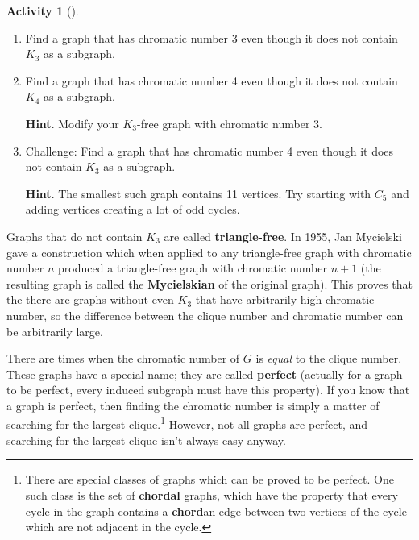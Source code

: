 \documentclass[10pt,]{book}
\newcommand{\terminology}[1]{\textbf{#1}}
\theoremstyle{plain}
\theoremstyle{definition}
\theoremstyle{definition}
\theoremstyle{definition}
\newtheorem{activity}[project]{Activity}
\numberwithin{equation}{chapter}
\begin{document}
\begin{activity}[]\label{activity-36}
\leavevmode%
\begin{enumerate}[font=\bfseries,label=(\alph*),ref=\alph*]
\item\label{task-55} \hypertarget{p-378}{}%
Find a graph that has chromatic number 3 even though it does not contain \(K_3\) as a subgraph.%
\item\label{task-56} \hypertarget{p-379}{}%
Find a graph that has chromatic number 4 even though it does not contain \(K_4\) as a subgraph.%
\par\smallskip%
\noindent\textbf{Hint}.\hypertarget{hint-16}{}\quad%
\hypertarget{p-380}{}%
Modify your \(K_3\)-free graph with chromatic number 3.%
\item\label{task-57} \hypertarget{p-381}{}%
Challenge: Find a graph that has chromatic number 4 even though it does not contain \(K_3\) as a subgraph.%
\par\smallskip%
\noindent\textbf{Hint}.\hypertarget{hint-17}{}\quad%
\hypertarget{p-382}{}%
The smallest such graph contains 11 vertices.  Try starting with \(C_5\) and adding vertices creating a lot of odd cycles.%
\end{enumerate}
\end{activity}
\hypertarget{p-383}{}%
Graphs that do not contain \(K_3\) are called \terminology{triangle-free}.  In 1955, Jan Mycielski gave a construction which when applied to any triangle-free graph with chromatic number \(n\) produced a triangle-free graph with chromatic number \(n+1\) (the resulting graph is called the \terminology{Mycielskian} of the original graph).  This proves that the there are graphs without even \(K_3\) that have arbitrarily high chromatic number, so the difference between the clique number and chromatic number can be arbitrarily large.%
\par
\hypertarget{p-384}{}%
There are times when the chromatic number of \(G\) is \emph{equal} to the clique number. These graphs have a special name; they are called \terminology{perfect} (actually for a graph to be perfect, every induced subgraph must have this property). If you know that a graph is perfect, then finding the chromatic number is simply a matter of searching for the largest clique.\footnote{There are special classes of graphs which can be proved to be perfect.  One such class is the set of \terminology{chordal} graphs, which have the property that every cycle in the graph contains a \terminology{chord}\textemdash{}an edge between two vertices of the cycle which are not adjacent in the cycle.\label{fn-5}} However, not all graphs are perfect, and searching for the largest clique isn't always easy anyway.%
\end{document}

